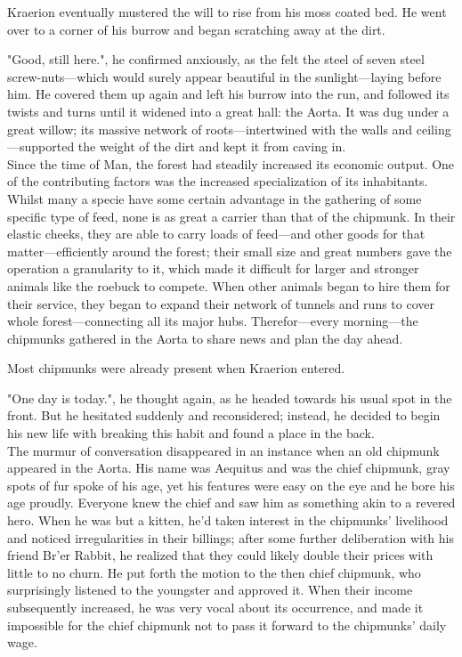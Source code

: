 Kraerion eventually mustered the will to rise from his moss coated bed. He went over to a corner of his burrow and began scratching away at the dirt.

"Good, still here.", he confirmed anxiously, as the felt the steel of seven steel screw-nuts---which would surely appear beautiful in the sunlight---laying before him. He covered them up again and left his burrow into the run, and followed its twists and turns until it widened into a great hall: the Aorta. It was dug under a great willow; its massive network of roots---intertwined with the walls and ceiling---supported the weight of the dirt and kept it from caving in.\\

Since the time of Man, the forest had steadily increased its economic output. One of the  contributing factors was the increased specialization of its inhabitants. Whilst many a specie have some certain advantage in the gathering of some specific type of feed, none is as great a carrier than that of the chipmunk. In their elastic cheeks, they are able to carry loads of feed---and other goods for that matter---efficiently around the forest; their small size and great numbers gave the operation a granularity to it, which made it difficult for larger and stronger animals like the roebuck to compete. When other animals began to hire them for their service, they began to expand their network of tunnels and runs to cover whole forest---connecting all its major hubs. Therefor---every morning---the chipmunks gathered in the Aorta to share news and plan the day ahead.

Most chipmunks were already present when Kraerion entered. 

"One day is today.", he thought again, as he headed towards his usual spot in the front. But he hesitated suddenly and reconsidered; instead, he decided to begin his new life with breaking this habit and found a place in the back.\\

The murmur of conversation disappeared in an instance when an old chipmunk appeared in the Aorta. His name was Aequitus and was the chief chipmunk, gray spots of fur spoke of his age, yet his features were easy on the eye and he bore his age proudly. Everyone knew the chief and saw him as something akin to a revered hero. When he was but a kitten, he'd taken interest in the chipmunks' livelihood and noticed irregularities in their billings; after some further deliberation with his friend Br'er Rabbit, he realized that they could likely double their prices with little to no churn. He put forth the motion to the then chief chipmunk, who surprisingly listened to the youngster and approved it. When their income subsequently increased, he was very vocal about its occurrence, and made it impossible for the chief chipmunk not to pass it forward to the chipmunks' daily wage.

